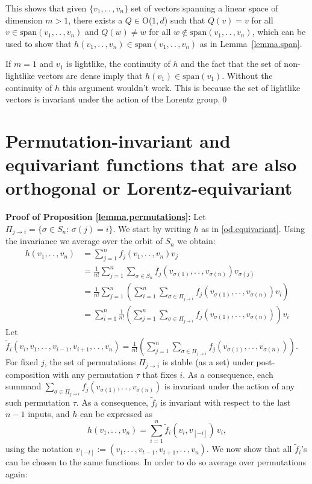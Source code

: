 \documentclass{article}
\renewcommand{\paragraph}[1]{\par\textbf{#1}}
\theoremstyle{Hogg}
\renewcommand{\ldots}{.\,.\,}
\begin{document}
This shows that given $\{v_1,\ldots, v_n\}$ set of vectors spanning a linear space of dimension $m>1$, there exists a $Q\in$O($1,d$) such that $Q(v)=v$ for all $v\in \text{span}(v_1,\ldots,v_n)$ and $Q(w)\neq w$ for all $w\not \in \text{span}(v_1,\ldots,v_n)$, which can be used to show that $h(v_1,\ldots,v_n)\in \text{span}(v_1,\ldots,v_n)$ as in Lemma~\ref{lemma.span}.

If $m=1$ and $v_1$ is lightlike, the continuity of $h$ and the fact that the set of non-lightlike vectors are dense imply that $h(v_1)\in\text{span}(v_1)$. Without the continuity of $h$ this argument wouldn't work. This is because the set of lightlike vectors is invariant under the action of the Lorentz group.\qed

\section{Permutation-invariant and equivariant functions that are also orthogonal or Lorentz-equivariant} \label{app.permutations}

\paragraph{Proof of Proposition \ref{lemma.permutations}:}
Let $\Pi_{j\to i}=\{\sigma \in S_n: \, \sigma(j)=i\}$. We start by writing  $h$ as in \eqref{od.equivariant}. Using the invariance we average over the orbit of $S_n$ we obtain:
\begin{align}
    h(v_1,\ldots, v_n) &=
    \sum_{j=1}^n f_j(v_1, \ldots, v_n) v_j
    \\
    &= \frac{1}{n!} \sum_{j=1}^n \sum_{\sigma \in S_n} f_j(v_{\sigma(1)}, \ldots, v_{\sigma(n)}) v_{\sigma(j)}
    \\
    &= \frac{1}{n!} \sum_{j=1}^n \left( \sum_{i=1}^n \sum_{\sigma \in \Pi_{j\to i}} f_j(v_{\sigma(1)}, \ldots, v_{\sigma(n)})v_i\right)
    \\
    &=\sum_{i=1}^n \frac{1}{n!}\left( \sum_{j=1}^n \sum_{\sigma \in \Pi_{j\to i}} f_j(v_{\sigma(1)}, \ldots, v_{\sigma(n)})\right)v_i
\end{align}
Let $\tilde f_i(v_i,v_1,\ldots,v_{i-1},v_{i+1}, \ldots, v_n) = \frac{1}{n!} \left( \sum_{j=1}^n \sum_{\sigma \in \Pi_{j\to i}} f_j(v_{\sigma(1)}, \ldots, v_{\sigma(n)})\right)$. For fixed $j$, the set of permutations $\Pi_{j\to i}$ is stable (as a set) under post-composition with any permutation $\tau$ that fixes $i$. As a consequence, each summand $\sum_{\sigma \in \Pi_{j\to i}} f_j(v_{\sigma(1)}, \ldots, v_{\sigma(n)})$ is invariant under the action of any such permutation $\tau$. As a consequence, $\tilde f_i$ is invariant with respect to the last $n-1$ inputs, and $h$ can be expressed as
\begin{equation}
    h(v_1,\ldots, v_n) = \sum_{i=1}^n \tilde f_i(v_{i}, v_{[-i]})\,v_i,
\end{equation}
using the notation $v_{[-t]}:=(v_1,\ldots,v_{t-1},v_{t+1}, \ldots, v_n)$.
We now show that all $\tilde f_i$'s can be chosen to the same functions. In order to do so average over permutations again:
\end{document}
